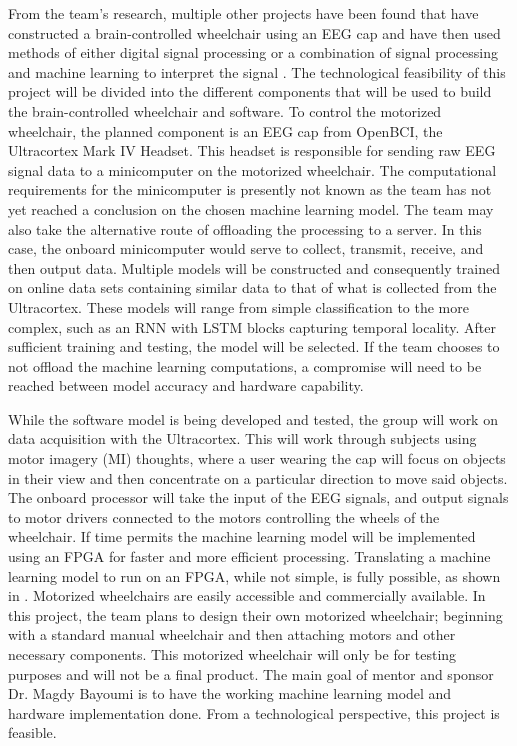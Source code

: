 \documentclass[conference]{IEEEtran}
\begin{document}
    From the team's research, multiple other projects have been found that have constructed a brain-controlled wheelchair using an EEG cap and have then used methods of either digital signal processing \cite{noninvasive_brain} or a combination of signal processing and machine learning to interpret the signal \cite{a_comprehensive_review, learning_to_control, robotic_architecture, toward_brain_computer}. The technological feasibility of this project will be divided into the different components that will be used to build the brain-controlled wheelchair and software. To control the motorized wheelchair, the planned component is an EEG cap from OpenBCI, the Ultracortex Mark IV Headset. This headset is responsible for sending raw EEG signal data to a minicomputer on the motorized wheelchair. The computational requirements for the minicomputer {is presently not known as the team has not yet reached a conclusion on the chosen machine learning model. The team may also take the alternative route of offloading the processing to a server. In this case, the onboard minicomputer would serve to collect, transmit, receive, and then output data.} Multiple models will be constructed and consequently trained on online data sets containing similar data to that of what is collected from the Ultracortex. These models will range from simple classification to the more complex, such as an RNN with LSTM blocks capturing temporal locality. After sufficient training and testing, the model will be selected. {If the team chooses to not offload the machine learning computations, a compromise will need to be reached between model accuracy and hardware capability.} 
    
    While the software model is being developed and tested, the group will work on data acquisition with the Ultracortex. This will work through subjects using motor imagery (MI) thoughts, where a user wearing the cap will focus on objects in their view and then concentrate on a particular direction to move said objects. The onboard processor will take the input of the EEG signals, and output signals to motor drivers connected to the motors controlling the wheels of the wheelchair. If time permits the machine learning model will be implemented using an FPGA for faster and more efficient processing. Translating a machine learning model to run on an FPGA, while not simple, is fully possible, as shown in \cite{fpga_intel}. Motorized wheelchairs are easily accessible and commercially available. In this project, the team plans to design their own motorized wheelchair; beginning with a standard manual wheelchair and then attaching motors and other necessary components. This motorized wheelchair will only be for testing purposes and will not be a final product. The main goal of mentor and sponsor Dr. Magdy  Bayoumi is to have the working machine learning model and hardware implementation done. From a technological perspective, this project is feasible.  
    
\end{document}
